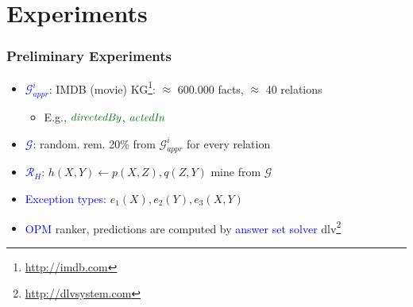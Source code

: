 \documentclass{beamer}
\newcommand{\bl}[1]{\textcolor{blue}{#1}}
\newcommand{\gr}[1]{\textcolor{darkgreen}{#1}}
\def\cG{\ensuremath{\mathcal{G}}}
\def\cR{\ensuremath{\mathcal{R}}}
\newcommand{\mi}[1]{\ensuremath{\mathit{#1}}}
\begin{document}
\section{Experiments}
\begin{frame}\frametitle{Preliminary Experiments}
\begin{itemize}
\item \bl{$\cG^i_{\mi{appr}}$}: IMDB (movie) KG\footnote{\url{http://imdb.com}}: $\approx$ 600.000 facts, $\approx$ 40 relations
\begin{itemize}
\item[] E.g., $\gr{\mi{directedBy}}$, $\gr{\mi{actedIn}}$
\end{itemize}
\medskip

\item \bl{$\cG$}: random. rem. 20\% from $\cG^i_{\mi{appr}}$ for every relation
\medskip

\item \bl{$\cR_H$}: $\mi{h(X,Y)\leftarrow p(X,Z),q(Z,Y)}$ mine from $\cG$
\medskip

\item \bl{Exception types}: $\mi{e_1(X),e_2(Y),e_3(X,Y)}$
\medskip

\item \bl{OPM} ranker, predictions are computed by \bl{answer set solver} dlv\footnote{\url{http://dlvsystem.com}}
\end{itemize}

\end{frame}
\end{document}
